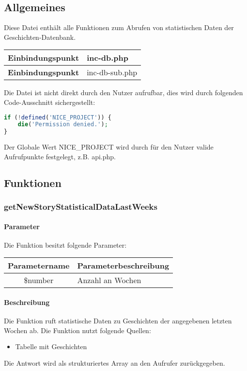 \subsection{Allgemeines} Diese Datei enthält alle Funktionen zum Abrufen von statistischen Daten der Geschichten-Datenbank.
\begin{table}[H]
	\begin{tabular}{|c|p{11cm}|}
		\hline
		\textbf{Einbindungspunkt} & inc-db.php \\ \hline
		\textbf{Einbindungspunkt} & inc-db-sub.php \\ \hline
	\end{tabular}
\end{table}
Die Datei ist nicht direkt durch den Nutzer aufrufbar, dies wird durch folgenden Code-Ausschnitt sichergestellt:
\begin{lstlisting}[language=php]
if (!defined('NICE_PROJECT')) {
	die('Permission denied.');
}
\end{lstlisting}
Der Globale Wert {\glqq NICE\_PROJECT\grqq} wird durch für den Nutzer valide Aufrufpunkte festgelegt, z.B. {\glqq api.php\grqq}.
\newpage
\subsection{Funktionen}
\subsubsection{getNewStoryStatisticalDataLastWeeks}
\paragraph{Parameter} Die Funktion besitzt folgende Parameter:
\begin{table}[H]
	\begin{tabular}{|c|p{11cm}|}
		\hline
		\textbf{Parametername} & \textbf{Parameterbeschreibung} \\ \hline
		\$number & Anzahl an Wochen \\ \hline
	\end{tabular}
\end{table}
\paragraph{Beschreibung} Die Funktion ruft statistische Daten zu Geschichten der angegebenen letzten Wochen ab. Die Funktion nutzt folgende Quellen:
\begin{itemize}
	\item Tabelle mit Geschichten
\end{itemize}
Die Antwort wird als strukturiertes Array an den Aufrufer zurückgegeben.
